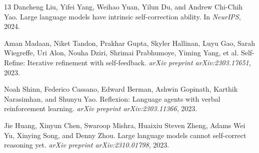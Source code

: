 \documentclass[10pt]{article}
\begin{document}
\begin{thebibliography}{13}
Dancheng Liu, Yifei Yang, Weihao Yuan, Yilun Du, and Andrew Chi-Chih Yao.
\newblock Large language models have intrinsic self-correction ability.
\newblock In \emph{NeurIPS}, 2024.

Aman Madaan, Niket Tandon, Prakhar Gupta, Skyler Hallinan, Luyu Gao, Sarah Wiegreffe, Uri Alon, Nouha Dziri, Shrimai Prabhumoye, Yiming Yang, et al.
\newblock Self-Refine: Iterative refinement with self-feedback.
\newblock \emph{arXiv preprint arXiv:2303.17651}, 2023.

Noah Shinn, Federico Cassano, Edward Berman, Ashwin Gopinath, Karthik Narasimhan, and Shunyu Yao.
\newblock Reflexion: Language agents with verbal reinforcement learning.
\newblock \emph{arXiv preprint arXiv:2303.11366}, 2023.

Jie Huang, Xinyun Chen, Swaroop Mishra, Huaixiu Steven Zheng, Adams Wei Yu, Xinying Song, and Denny Zhou.
\newblock Large language models cannot self-correct reasoning yet.
\newblock \emph{arXiv preprint arXiv:2310.01798}, 2023.

\end{thebibliography}
\end{document}
